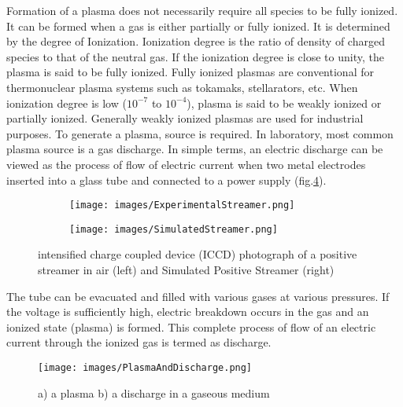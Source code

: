 \documentclass[paper=a4, fontsize=13pt]{scrartcl}
\begin{document}
Formation of a plasma does not necessarily require all species to be fully ionized. It can be formed when a gas is either partially or fully ionized. It is determined by the degree of Ionization. Ionization degree is the ratio of density of charged species to that of the neutral gas. If the ionization degree is close to unity, the plasma is said to be fully ionized. Fully ionized plasmas are conventional for thermonuclear plasma systems such as tokamaks, stellarators, etc. When ionization degree is low ($10^{-7}$ to $10^{-4}$), plasma is said to be weakly ionized or partially ionized. Generally weakly ionized plasmas are used for industrial purposes. To generate a plasma, source is required. In laboratory, most common plasma source is a gas discharge. In simple terms, an electric discharge can be viewed as the process of flow of electric current when two metal electrodes inserted into a glass tube and connected to a power supply (fig.\ref{fig:Gas Discharge}).



\begin{figure}
\centering
\begin{subfigure}
  \centering
  \texttt{[image: images/ExperimentalStreamer.png]}
  \label{fig:sub1}
\end{subfigure}%
\begin{subfigure}
  \centering
  \texttt{[image: images/SimulatedStreamer.png]}
  \label{fig:sub2}
\end{subfigure}
\caption{intensified charge coupled device (ICCD) photograph of a positive streamer in air \cite{Ebert2006TheStreamers} (left) and Simulated Positive Streamer (right)}
\label{fig:test}
\end{figure}

The tube can be evacuated and filled with various gases at various pressures. If the voltage is sufficiently high, electric breakdown occurs in the gas and an ionized state (plasma) is formed. This complete process of flow of an electric current through the ionized gas is termed as discharge. 

\begin{figure}
\centering
\texttt{[image: images/PlasmaAndDischarge.png]}
  \caption{a) a plasma b) a discharge in a gaseous medium}
  \label{fig:Gas Discharge}
\end{figure}
\end{document}
